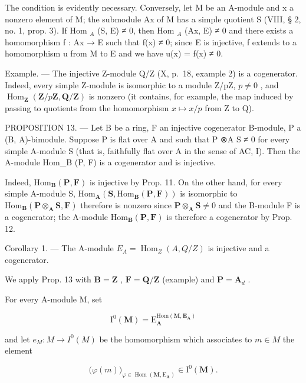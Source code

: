 The condition is evidently necessary. Conversely, let M be an A-module and x a nonzero element of M; the submodule Ax of M has a simple quotient S (VIII, § 2, no. 1, prop. 3). If Hom \(_{A}\) (S, E) ≠ 0, then Hom \(_{A}\) (Ax, E) ≠ 0 and there exists a homomorphism f : Ax → E such that f(x) ≠ 0; since E is injective, f extends to a homomorphism u from M to E and we have u(x) = f(x) ≠ 0.

Example. --- The injective Z-module Q/Z (X, p.~18, example 2) is a cogenerator. Indeed, every simple Z-module is isomorphic to a module Z/pZ, \(p \neq 0\) , and \(\operatorname{Hom}_{\mathbf{Z}}(\mathbf{Z}/p\mathbf{Z}, \mathbf{Q}/\mathbf{Z})\) is nonzero (it contains, for example, the map induced by passing to quotients from the homomorphism \(x \mapsto x/p\) from Z to Q).

PROPOSITION 13. --- Let B be a ring, F an injective cogenerator B-module, P a (B, A)-bimodule. Suppose P is flat over A and such that P ⊗A S ≠ 0 for every simple A-module S (that is, faithfully flat over A in the sense of AC, I). Then the A-module Hom\_B (P, F) is a cogenerator and is injective.

Indeed, \(\mathrm{Hom}_{\mathbf{B}}(\mathbf{P},\mathbf{F})\) is injective by Prop. 11. On the other hand, for every simple A-module S, \(\mathrm{Hom}_{\mathbf{A}}(\mathbf{S},\mathrm{Hom}_{\mathbf{B}}(\mathbf{P},\mathbf{F}))\) is isomorphic to \(\mathrm{Hom}_{\mathbf{B}}(\mathbf{P}\otimes_{\mathbf{A}}\mathbf{S},\mathbf{F})\) therefore is nonzero since \(\mathbf{P}\otimes_{\mathbf{A}}\mathbf{S}\neq 0\) and the B-module F is a cogenerator; the A-module \(\mathrm{Hom}_{\mathbf{B}}(\mathbf{P},\mathbf{F})\) is therefore a cogenerator by Prop. 12.

Corollary 1. --- The A-module \(E_{A} = \operatorname{Hom}_{Z}(A, Q/Z)\) is injective and a cogenerator.

We apply Prop. 13 with \(\mathbf{B} = \mathbf{Z}\) , \(\mathbf{F} = \mathbf{Q} / \mathbf{Z}\) (example) and \(\mathbf{P} = \mathbf{A}_d\) .

For every A-module M, set

\[
\mathrm{I} ^ {0} (\mathbf {M}) = \mathrm{E} _ {\mathbf {A}} ^ {\mathrm{Hom} (\mathbf {M}, \mathbf {E} _ {\mathbf {A}})}
\]

and let \(e_{M}: M \to I^{0}(M)\) be the homomorphism which associates to \(m \in M\) the element

\[
\big (\varphi (m) \big) _ {\varphi \in \operatorname{Hom} (\mathbf {M}, \mathrm{E} _ {\mathbf {A}})} \in \mathrm{I} ^ {0} (\mathbf {M}).
\]

